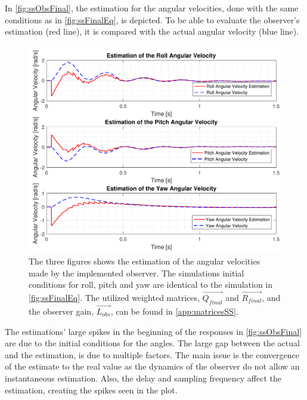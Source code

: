 In \autoref{fig:ssObsFinal}, the estimation for the angular velocities, done with the same conditions as in \autoref{fig:ssFinalEq}, is depicted. To be able to evaluate the observer's estimation (red line), it is compared with the actual angular velocity (blue line). 
\begin{figure}[H]
	\centering
	\includegraphics[scale=0.6]{figures/ssObsFinal.pdf}
	\caption{The three figures shows the estimation of the angular velocities made by the implemented observer. The simulations initial conditions for roll, pitch and yaw are identical to the simulation in \autoref{fig:ssFinalEq}. The utilized weighted matrices, $\vec{Q_{final}}$ and $\vec{R_{final}}$, and the observer gain, $\vec{L_{obs}}$, can be found in \autoref{app:matricesSS}.}
	\label{fig:ssObsFinal}
\end{figure}
\vspace{-0.8 cm}
The estimations' large spikes in the beginning of the responses in \autoref{fig:ssObsFinal} are due to the initial conditions for the angles. The large gap between the actual and the estimation, is due to multiple factors. The main issue is the convergence of the estimate to the real value as the dynamics of the observer do not allow an instantaneous estimation. Also, the delay and sampling frequency affect the estimation, creating the spikes seen in the plot. %
%

